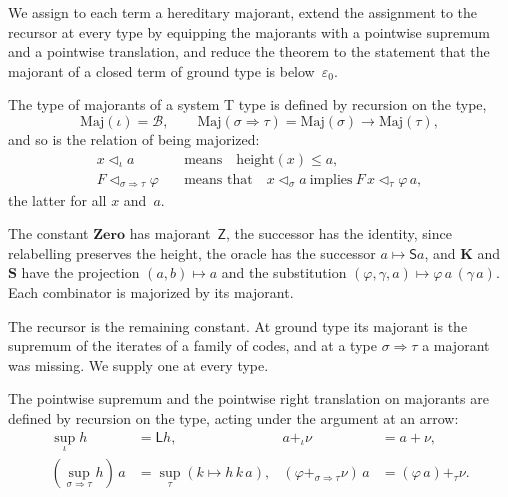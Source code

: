 \documentclass[11pt]{amsart}
\makeatletter
\newcommand{\gr}{\iota}                      %
\newcommand{\arr}{\Rightarrow}
\newcommand{\height}{\mathrm{height}}
\newcommand{\Kc}{\mathbf{K}}
\newcommand{\Sc}{\mathbf{S}}
\newcommand{\Zeroc}{\mathbf{Zero}}
\newcommand{\Brouwer}{\mathcal{B}}
\newcommand{\bZ}{\mathsf{Z}}
\newcommand{\bS}{\mathsf{S}}
\newcommand{\bL}{\mathsf{L}}
\newcommand{\bplus}{\mathbin{+}}
\newcommand{\eps}{\varepsilon_{0}}
\newcommand{\Maj}{\mathrm{Maj}}
\newcommand{\maj}{\mathrel{\lhd}}             %
\newif\ifagdarefs
\newcommand{\AgdaRefs}[1]{\ifagdarefs{\footnotesize\color{agdablue}(#1)}\else\unskip\fi}
\newcommand{\Agda}[2]{{\footnotesize\color{agdablue}\textsf{#1}%
  \ifblank{#2}{}{\texttt{.}\allowbreak\texttt{#2}}}}
\let\ttt@plain\texttt
\renewcommand{\texttt}[1]{{\footnotesize\color{agdablue}\ttt@plain{#1}}}
\theoremstyle{plain}
\theoremstyle{definition}
\makeatother
\begin{document}
We assign to each term a hereditary majorant, extend the assignment to
the recursor at every type by equipping the majorants with a pointwise
supremum and a pointwise translation, and reduce the theorem to the
statement that the majorant of a closed term of ground type is
below~$\eps$.

\begin{definition}[Majorants]
\label{def:majorant}
The type of majorants of a system T type is defined by recursion on
the type,
\[
  \Maj(\gr) = \Brouwer , \qquad
  \Maj(\sigma\arr\tau) = \Maj(\sigma) \to \Maj(\tau) ,
\]
and so is the relation of being majorized:
\begin{align*}
  x \maj_{\gr} a &\quad\text{means}\quad \height(x) \le a , \\
  F \maj_{\sigma\arr\tau} \varphi &\quad\text{means that}\quad
    x \maj_{\sigma} a \ \text{implies}\ F\,x \maj_{\tau} \varphi\,a ,
\end{align*}
the latter for all $x$ and~$a$.
\AgdaRefs{\Agda{DialogueTrees.Majorant}{Maj}; \texttt{R}.}
\end{definition}

\begin{definition}
\label{def:majorant-combinators}
The constant $\Zeroc$ has majorant~$\bZ$, the successor has the
identity, since relabelling preserves the height, the oracle has the
successor $a \mapsto \bS a$, and $\Kc$ and~$\Sc$ have the projection
$(a,b)\mapsto a$ and the substitution
$(\varphi,\gamma,a) \mapsto \varphi\,a\,(\gamma\,a)$. Each combinator
is majorized by its majorant.
\AgdaRefs{\Agda{DialogueTrees.Majorant}{μ-Zero}; \texttt{μ-Succ},
\texttt{μ-Ω}, \texttt{μ-K}, \texttt{μ-S}, \texttt{R-Zero},
\texttt{R-Succ}, \texttt{R-Ω}, \texttt{R-K}, \texttt{R-S}.}
\end{definition}

The recursor is the remaining constant. At ground type its majorant is
the supremum of the iterates of a family of codes, and at a type
$\sigma\arr\tau$ a majorant was missing. We supply one at every type.

\begin{definition}
\label{def:maj-sup}
The pointwise supremum and the pointwise right translation on
majorants are defined by recursion on the type, acting under the
argument at an arrow:
\begin{align*}
  \textstyle\sup_{\gr} h &= \bL h , &
  a \bplus_{\gr} \nu &= a \bplus \nu , \\
  \textstyle(\sup_{\sigma\arr\tau} h)\,a
    &= \textstyle\sup_{\tau} (k \mapsto h\,k\,a) , &
  (\varphi \bplus_{\sigma\arr\tau} \nu)\,a
    &= (\varphi\,a) \bplus_{\tau} \nu .
\end{align*}
\AgdaRefs{\Agda{DialogueTrees.MajorantAll}{Maj-sup};
\texttt{Maj-⊕},
\texttt{μ-Kleisli}.}
\end{definition}
\end{document}
